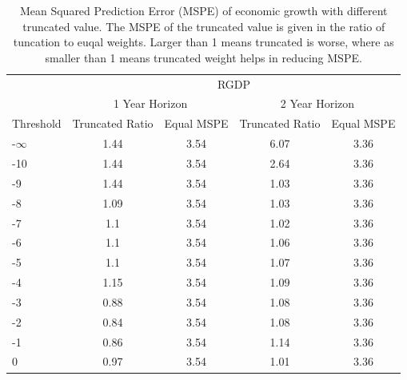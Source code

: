 \documentclass[]{article}
\begin{document}
\begin{table}[!h]
\centering
\caption{Mean Squared Prediction Error (MSPE) of economic growth with different truncated value. The MSPE of the truncated value is given in the ratio of tuncation to euqal weights. Larger than 1 means truncated is worse, where as smaller than 1 means truncated weight helps in reducing MSPE.}
\label{tab: MSPE RGDP}
\begin{tabular}{lcccc}
\hline
          & \multicolumn{4}{c}{RGDP}                                                \\
          \cmidrule{2-5}
          & \multicolumn{2}{c}{1 Year Horizon} & \multicolumn{2}{c}{2 Year Horizon} \\
          \cmidrule{2-3} \cmidrule{4-5}
Threshold & Truncated Ratio    & Equal MSPE    & Truncated Ratio    & Equal MSPE    \\
\cmidrule{1-1} \cmidrule{2-2} \cmidrule{3-3} \cmidrule{4-4} \cmidrule{5-5}
-$\infty$ & 1.44 & 3.54 & 6.07 & 3.36 \\
-10       & 1.44 & 3.54 & 2.64 & 3.36 \\
-9        & 1.44 & 3.54 & 1.03 & 3.36 \\
-8        & 1.09 & 3.54 & 1.03 & 3.36 \\
-7        & 1.1  & 3.54 & 1.02 & 3.36 \\
-6        & 1.1  & 3.54 & 1.06 & 3.36 \\
-5        & 1.1  & 3.54 & 1.07 & 3.36 \\
-4        & 1.15 & 3.54 & 1.09 & 3.36 \\
-3        & 0.88 & 3.54 & 1.08 & 3.36 \\
-2        & 0.84 & 3.54 & 1.08 & 3.36 \\
-1        & 0.86 & 3.54 & 1.14 & 3.36 \\
0         & 0.97 & 3.54 & 1.01 & 3.36 \\ \hline
\end{tabular}
\end{table}
\end{document}
